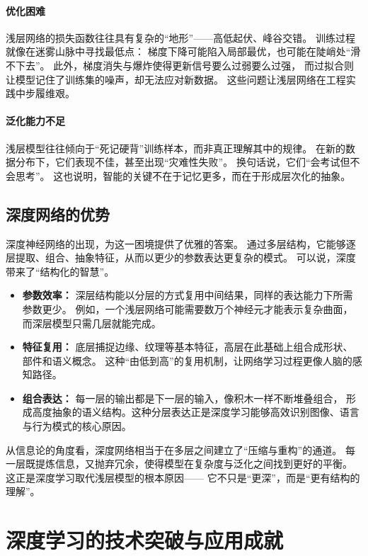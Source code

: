 \paragraph{优化困难}  
浅层网络的损失函数往往具有复杂的“地形”——高低起伏、峰谷交错。  
训练过程就像在迷雾山脉中寻找最低点：  
梯度下降可能陷入局部最优，也可能在陡峭处“滑不下去”。  
此外，梯度消失与爆炸使得更新信号要么过弱要么过强，  
而过拟合则让模型记住了训练集的噪声，却无法应对新数据。  
这些问题让浅层网络在工程实践中步履维艰。

\paragraph{泛化能力不足}  
浅层模型往往倾向于“死记硬背”训练样本，而非真正理解其中的规律。  
在新的数据分布下，它们表现不佳，甚至出现“灾难性失败”。  
换句话说，它们“会考试但不会思考”。  
这也说明，智能的关键不在于记忆更多，而在于形成层次化的抽象。

\subsection{深度网络的优势}

深度神经网络的出现，为这一困境提供了优雅的答案。  
通过多层结构，它能够逐层提取、组合、抽象特征，从而以更少的参数表达更复杂的模式。  
可以说，深度带来了“结构化的智慧”。

\begin{itemize}
\item {\bf 参数效率：} 深层结构能以分层的方式复用中间结果，同样的表达能力下所需参数更少。  
例如，一个浅层网络可能需要数万个神经元才能表示复杂曲面，而深层模型只需几层就能完成。
\item {\bf 特征复用：} 底层捕捉边缘、纹理等基本特征，高层在此基础上组合成形状、部件和语义概念。  
这种“由低到高”的复用机制，让网络学习过程更像人脑的感知路径。
\item {\bf 组合表达：} 每一层的输出都是下一层的输入，像积木一样不断堆叠组合，  
形成高度抽象的语义结构。这种分层表达正是深度学习能够高效识别图像、语言与行为模式的核心原因。
\end{itemize}

从信息论的角度看，深度网络相当于在多层之间建立了“压缩与重构”的通道。  
每一层既提炼信息，又抛弃冗余，使得模型在复杂度与泛化之间找到更好的平衡。  
这正是深度学习取代浅层模型的根本原因——  
它不只是“更深”，而是“更有结构的理解”。

\section{深度学习的技术突破与应用成就}

